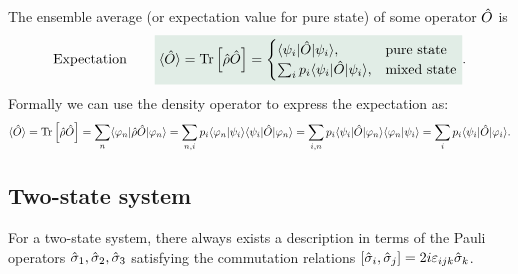 The ensemble average (or expectation value for pure state) of some operator $\hat{O}$ is 
\begin{align}
    \text{Expectation}\qquad\highlight{\braket{\hO}=\Tr{\hrho\hO}=\begin{cases}
        \braket{\psi_i|\hO|\psi_i},&\text{pure state}\\
        \sum_ip_i\braket{\psi_i|\hO|\psi_i},&\text{mixed state}
    \end{cases}}.
\end{align}
Formally we can use the density operator to express the expectation as: 
\begin{align*}
    \langle\hat{O}\rangle=\text{Tr}\left[\hat{\rho}\hat{O}\right]=\sum_n\langle\varphi_n|\hat{\rho}\hat{O}|\varphi_n\rangle=\sum_{n,i}p_i\langle\varphi_n|\psi_i\rangle\langle\psi_i|\hat{O}|\varphi_n\rangle=
    \sum_{i,n}p_i\langle\psi_i|\hat{O}|\varphi_n\rangle\langle\varphi_n|\psi_i\rangle=\sum_ip_i\langle\psi_i|\hat{O}|\varphi_i\rangle.
\end{align*}
%
\subsection{Two-state system}
For a two-state system, there always exists a description in terms of the Pauli operators $\hat{\sigma}_1,\hat{\sigma}_2,\hat{\sigma}_3$
satisfying the commutation relations $[\hat{\sigma}_i,\hat{\sigma}_j]=2i\varepsilon_{ijk}\hat{\sigma}_k$.

